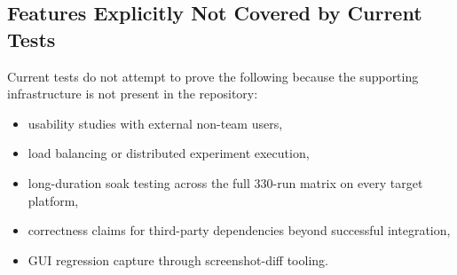 \subsection{Features Explicitly Not Covered by Current Tests}

Current tests do not attempt to prove the following because the supporting infrastructure is
not present in the repository:

\begin{itemize}[nosep]
	\item usability studies with external non-team users,
	\item load balancing or distributed experiment execution,
	\item long-duration soak testing across the full 330-run matrix on every target platform,
	\item correctness claims for third-party dependencies beyond successful integration,
	\item GUI regression capture through screenshot-diff tooling.
\end{itemize}
